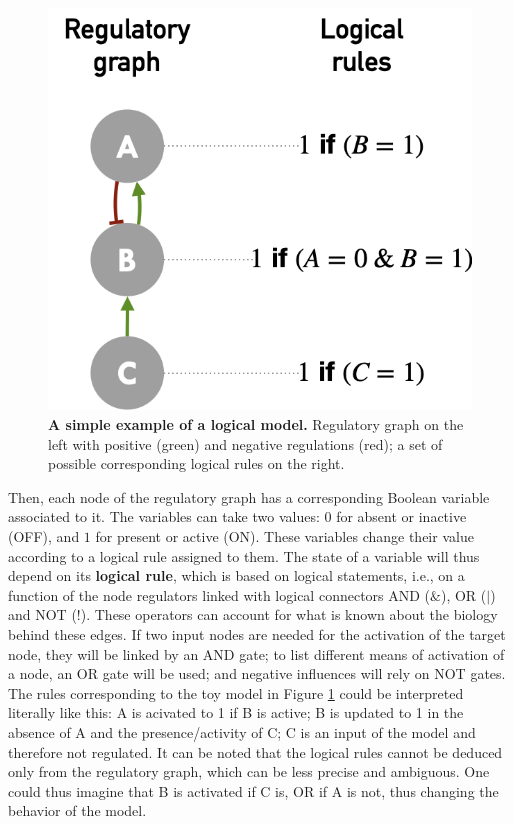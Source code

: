 \documentclass[a4paper,12pt,twoside,onecolumn,openright,final,oldfontcommands]{memoir}
\begin{document}
\begin{figure}

{\centering \includegraphics[width=0.5\linewidth]{fig/logical} 

}

\caption[A simple example of a logical model]{\textbf{A simple example of a logical model.}
Regulatory graph on the left with positive (green) and negative
regulations (red); a set of possible corresponding logical rules on the
right.}\label{fig:logical}
\end{figure}






Then, each node of the regulatory graph has a corresponding Boolean
variable associated to it. The variables can take two values: \(0\) for
absent or inactive (OFF), and \(1\) for present or active (ON). These
variables change their value according to a logical rule assigned to
them. The state of a variable will thus depend on its \textbf{logical
rule}, which is based on logical statements, i.e., on a function of the
node regulators linked with logical connectors AND (\(\&\)), OR (\(|\))
and NOT (\(!\)). These operators can account for what is known about the
biology behind these edges. If two input nodes are needed for the
activation of the target node, they will be linked by an AND gate; to
list different means of activation of a node, an OR gate will be used;
and negative influences will rely on NOT gates. The rules corresponding
to the toy model in Figure \ref{fig:logical} could be interpreted
literally like this: A is acivated to 1 if B is active; B is updated to
1 in the absence of A and the presence/activity of C; C is an input of
the model and therefore not regulated. It can be noted that the logical
rules cannot be deduced only from the regulatory graph, which can be
less precise and ambiguous. One could thus imagine that B is activated
if C is, OR if A is not, thus changing the behavior of the model.
\end{document}
